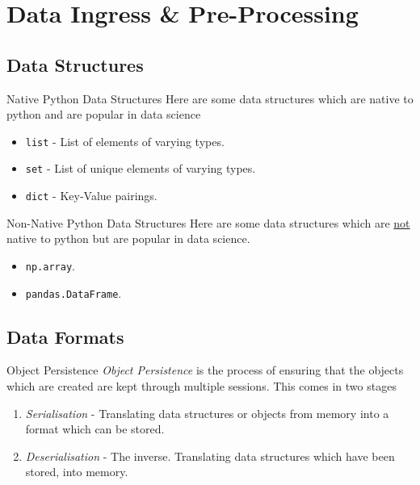 \documentclass[11pt,a4paper]{article}
\begin{document}
\section{Data Ingress \& Pre-Processing}\label{sec_data_ingress}

\subsection{Data Structures}

  \begin{proposition}{Native Python Data Structures}
    Here are some data structures which are native to python and are popular in data science
    \begin{itemize}
      \item \texttt{list} - List of elements of varying types.
      \item \texttt{set} - List of unique elements of varying types.
      \item \texttt{dict} - Key-Value pairings.
    \end{itemize}
  \end{proposition}

  \begin{proposition}{Non-Native Python Data Structures}
    Here are some data structures which are \underline{not} native to python but are popular in data science.
    \begin{itemize}
      \item \texttt{np.array}.
      \item \texttt{pandas.DataFrame}.
    \end{itemize}
  \end{proposition}

\subsection{Data Formats}

  \begin{definition}{Object Persistence}
    \textit{Object Persistence} is the process of ensuring that the objects which are created are kept through multiple sessions. This comes in two stages
    \begin{enumerate}
      \item \textit{Serialisation} - Translating data structures or objects from memory into a format which can be stored.
      \item \textit{Deserialisation} - The inverse. Translating data structures which have been stored, into memory.
    \end{enumerate}
  \end{definition}
\end{document}

